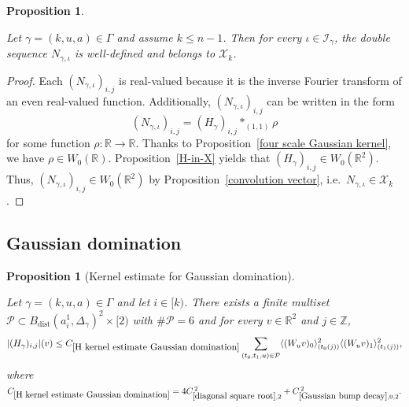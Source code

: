\documentclass[12pt,reqno]{amsart}
\theoremstyle{plain}
\newtheorem{proposition}[theorem]{Proposition}
\numberwithin{equation}{section}
\theoremstyle{remark}
\newcommand{\uses}[1]{}
\newcommand{\usesdefs}[1]{}
\newcommand{\leanok}{}
\newcommand{\lean}[1]{}
\newcommand{\Z}{{\mathbb Z}}
\newcommand{\R}{{\mathbb R}}
\begin{document}
\begin{proposition}\label{auto:N-kernel-well-definedness}
\lean{Auto.nKernelWellDefinedness}
\leanok
\uses{four scale Gaussian kernel,H-in-X,convolution vector}\usesdefs{auto:Wiener-space-definition,auto:convolution-along-vector-definition,geometric parameters,double sequence of 2D functions,H multiplier,L multiplier,N multiplier}
Let $\gamma=(k,u,a)\in \Gamma$ and assume $k\le n-1$. Then for every $\iota\in\mathcal{I}_{\gamma}$, the double sequence $N_{\gamma,\iota}$ is well-defined and belongs to $\mathcal{X}_k$.
\end{proposition}

\begin{proof}
Each $(N_{\gamma,\iota})_{i,j}$ is real-valued because it is the inverse Fourier transform of an even real-valued function.
Additionally, $(N_{\gamma,\iota})_{i,j}$ can be written in the form
\[
(N_{\gamma,\iota})_{i,j}=(H_\gamma)_{i,j} \ast_{(1,1)} \rho
\]
for some function $\rho: \R \to \R$.
Thanks to Proposition~\ref{four scale Gaussian kernel}, we have $\rho \in W_0(\R)$.  Proposition~\ref{H-in-X} yields that $(H_{\gamma})_{i,j} \in W_0(\R^2)$. Thus, $(N_{\gamma,\iota})_{i,j} \in W_0(\R^2)$ by Proposition~\ref{convolution vector}, i.e.\ $N_{\gamma,\iota} \in \mathcal{X}_k$.
\end{proof}


\subsection{Gaussian domination}

\begin{proposition}[Kernel estimate for Gaussian domination]\label{H kernel estimate Gaussian domination}
\lean{Auto.hKernelEstimateGaussianDomination}
\leanok
\uses{Operations on spaced sequences,Properties of distance of sequences,diagonal square root,Gaussian bump decay}\usesdefs{gaussian,bracket bump,multiplicatively spaced monotone sequences,Distance of spaced sequences,closed balls in A,geometric parameters,auto:unitary-matrices-definition,2D Gaussians,auto:Gaussian-difference-kernel-definition,square root Gaussian difference,s multiplier,H multiplier}
Let $\gamma=(k,u,a)\in \Gamma$ and let $i\in [k)$.
There exists a finite multiset $\mathcal{P}\subset B_{\mathrm{dist}}(a_i^1,\Delta_\gamma)^2\times [2)$ with $\#\mathcal{P}= 6$ and for every $v\in \R^2$ and $j\in\Z$,
\begin{equation}\label{auto:H-kernel-Gaussian-domination}|(H_\gamma)_{i,j}|(v) \le C_{\ref{H kernel estimate Gaussian domination}} \sum_{(t_0,t_1,u)\in\mathcal{P}} \langle (W_u v)_0\rangle_{(t_0(j))}^2 \langle (W_u v)_1\rangle_{(t_1(j))}^2, \end{equation}
where
$C_{\ref{H kernel estimate Gaussian domination}}
=
4C_{\ref{diagonal square root},2}^{\,2}
+
C_{\ref{Gaussian bump decay},0,2}^{\,2}.$
\end{proposition}
\end{document}
